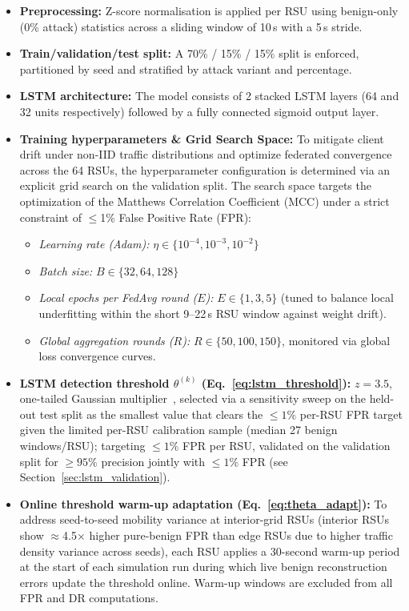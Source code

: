 \documentclass[12pt, a4paper]{report}
\begin{document}
{{\begin{itemize}
    \item \textbf{Preprocessing:} Z-score normalisation is applied per RSU using benign-only (0\% attack) statistics across a sliding window of 10\,s with a 5\,s stride.
    \item \textbf{Train/validation/test split:} A 70\% / 15\% / 15\% split is enforced, partitioned by seed and stratified by attack variant and percentage.
    \item \textbf{LSTM architecture:} The model consists of 2 stacked LSTM layers (64 and 32 units respectively) followed by a fully connected sigmoid output layer.
    \item \textbf{Training hyperparameters \& Grid Search Space:} To mitigate client drift under non-IID traffic distributions and optimize federated convergence across the 64 RSUs, the hyperparameter configuration is determined via an explicit grid search on the validation split. The search space targets the optimization of the Matthews Correlation Coefficient (MCC) under a strict constraint of $\le$1\% False Positive Rate (FPR):
    \begin{itemize}
        \item \textit{Learning rate (Adam):} $\eta \in \{10^{-4}, 10^{-3}, 10^{-2}\}$
        \item \textit{Batch size:} $B \in \{32, 64, 128\}$
        \item \textit{Local epochs per FedAvg round ($E$):} $E \in \{1, 3, 5\}$ (tuned to balance local underfitting within the short 9--22\,s RSU window against weight drift).
        \item \textit{Global aggregation rounds ($R$):} $R \in \{50, 100, 150\}$, monitored via global loss convergence curves.
    \end{itemize}
    \item \textbf{LSTM detection threshold $\theta^{(k)}$ (Eq.~\ref{eq:lstm_threshold}):}
               $z = 3.5$, one-tailed Gaussian multiplier~\cite{casella2002statistical}, selected via a sensitivity sweep on the held-out test split as the smallest value that clears the $\leq1\%$ per-RSU FPR target given the limited per-RSU calibration sample (median 27 benign windows/RSU); targeting $\leq1\%$ FPR per RSU, validated on the validation split for $\geq 95\%$ precision jointly with $\leq 1\%$ FPR (see Section~\ref{sec:lstm_validation}).

    \item \textbf{Online threshold warm-up adaptation
    (Eq.~\ref{eq:theta_adapt}):}
    To address seed-to-seed mobility variance at
    interior-grid \ac{RSU}s (interior \ac{RSU}s show
    $\approx$4.5$\times$ higher pure-benign \ac{FPR}
    than edge \ac{RSU}s due to higher traffic density
    variance across seeds), each \ac{RSU} applies a
    30-second warm-up period at the start of each
    simulation run during which live benign
    reconstruction errors update the threshold online.
    Warm-up windows are excluded from all \ac{FPR}
    and \ac{DR} computations.


\end{itemize}}}
\end{document}
